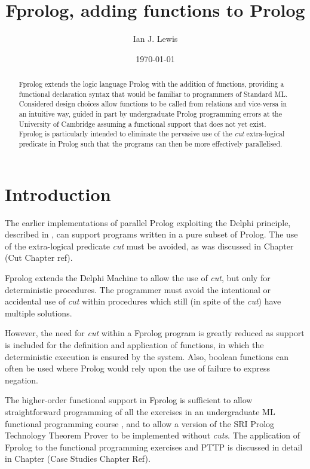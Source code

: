 \documentclass[a4paper,11pt,twoside]{article}
\author{Ian J. Lewis}
\date{\today}
\title{Fprolog, adding functions to Prolog}
\begin{document}
\maketitle

\begin{abstract}
    Fprolog extends the logic language Prolog with the addition of functions,
    providing a functional declaration syntax that would be familiar to programmers of
    Standard ML. Considered design choices allow functions to be called from relations and vice-versa
    in an intuitive way, guided in part by undergraduate Prolog programming errors at the University of
    Cambridge assuming a functional support that does not yet exist.
    Fprolog is particularly intended to eliminate the pervasive use of the \textit{cut} extra-logical
    predicate in Prolog such that the programs can then be more effectively parallelised.
\end{abstract}

\setlength{\parskip}{8pt}

\pagestyle{headings}

\label{functions}

\section{Introduction} %

The earlier implementations of parallel Prolog exploiting the Delphi
principle, described in \cite{CA87,Clo87,Wre90,Kle91,Sar95},
can support programs written in a pure subset of Prolog.  The use of
the extra-logical predicate \textit{cut} must be avoided, as was discussed in
Chapter (Cut Chapter ref).

Fprolog extends the Delphi Machine to allow the use of \textit{cut},
but only for
deterministic procedures.  The programmer must avoid the
intentional or accidental use of \textit{cut} within
procedures which still (in spite of the \textit{cut}) have
multiple solutions.  

However, the need for \textit{cut} within a
Fprolog program is greatly reduced as
support is included for the definition and application
of functions, in which the deterministic
execution is ensured by the system.  Also, boolean functions can often
be used where Prolog would rely upon the use of failure to express negation.

The higher-order functional support in Fprolog is sufficient to allow
straightforward programming of all the exercises in an undergraduate ML
functional programming course \cite{Pau88}, and to allow a version of the SRI Prolog 
Technology Theorem Prover \cite{Sti88} to be implemented without \textit{cuts}.
The application of Fprolog to the functional programming exercises and PTTP is
discussed in detail in Chapter (Case Studies Chapter Ref).
\end{document}
